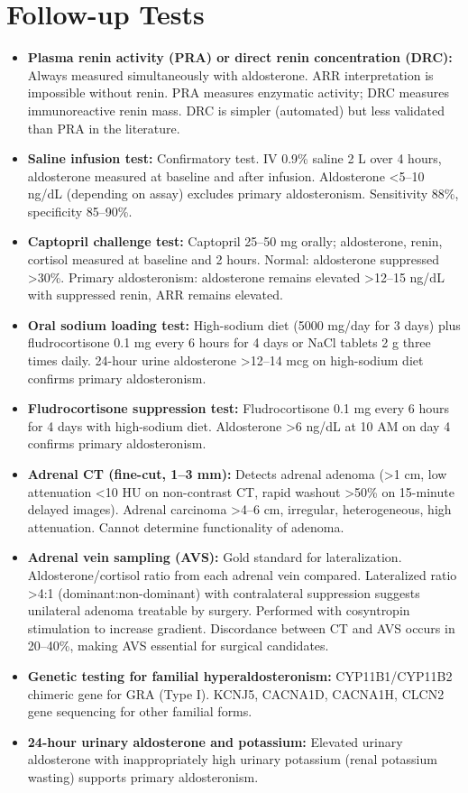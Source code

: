 \section*{Follow-up Tests}
\begin{itemize}
  \item \textbf{Plasma renin activity (PRA) or direct renin concentration (DRC):} Always measured simultaneously with aldosterone. ARR interpretation is impossible without renin. PRA measures enzymatic activity; DRC measures immunoreactive renin mass. DRC is simpler (automated) but less validated than PRA in the literature.
  \item \textbf{Saline infusion test:} Confirmatory test. IV 0.9\% saline 2 L over 4 hours, aldosterone measured at baseline and after infusion. Aldosterone <5--10 ng/dL (depending on assay) excludes primary aldosteronism. Sensitivity 88\%, specificity 85--90\%.
  \item \textbf{Captopril challenge test:} Captopril 25--50 mg orally; aldosterone, renin, cortisol measured at baseline and 2 hours. Normal: aldosterone suppressed >30\%. Primary aldosteronism: aldosterone remains elevated >12--15 ng/dL with suppressed renin, ARR remains elevated.
  \item \textbf{Oral sodium loading test:} High-sodium diet (5000 mg/day for 3 days) plus fludrocortisone 0.1 mg every 6 hours for 4 days or NaCl tablets 2 g three times daily. 24-hour urine aldosterone >12--14 mcg on high-sodium diet confirms primary aldosteronism.
  \item \textbf{Fludrocortisone suppression test:} Fludrocortisone 0.1 mg every 6 hours for 4 days with high-sodium diet. Aldosterone >6 ng/dL at 10 AM on day 4 confirms primary aldosteronism.
  \item \textbf{Adrenal CT (fine-cut, 1--3 mm):} Detects adrenal adenoma (>1 cm, low attenuation <10 HU on non-contrast CT, rapid washout >50\% on 15-minute delayed images). Adrenal carcinoma >4--6 cm, irregular, heterogeneous, high attenuation. Cannot determine functionality of adenoma.
  \item \textbf{Adrenal vein sampling (AVS):} Gold standard for lateralization. Aldosterone/cortisol ratio from each adrenal vein compared. Lateralized ratio >4:1 (dominant:non-dominant) with contralateral suppression suggests unilateral adenoma treatable by surgery. Performed with cosyntropin stimulation to increase gradient. Discordance between CT and AVS occurs in 20--40\%, making AVS essential for surgical candidates.
  \item \textbf{Genetic testing for familial hyperaldosteronism:} CYP11B1/CYP11B2 chimeric gene for GRA (Type I). KCNJ5, CACNA1D, CACNA1H, CLCN2 gene sequencing for other familial forms.
  \item \textbf{24-hour urinary aldosterone and potassium:} Elevated urinary aldosterone with inappropriately high urinary potassium (renal potassium wasting) supports primary aldosteronism.
\end{itemize}


